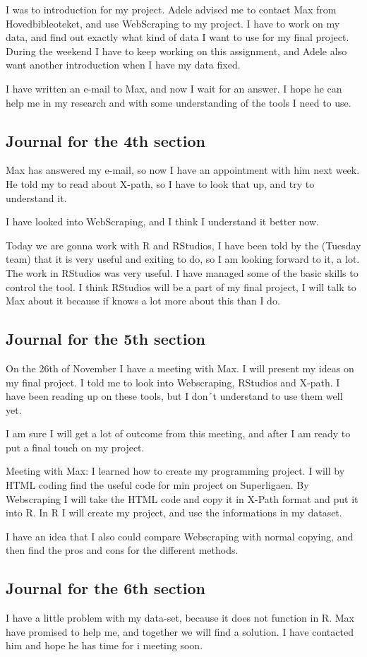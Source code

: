 \documentclass{article}
\begin{document}
I was to introduction for my project. Adele advised me to contact Max from Hovedbibleoteket, and use WebScraping to my project. I have to work on my data, and find out exactly what kind of data I want to use for my final project. During the weekend I have to keep working on this assignment, and Adele also want another introduction when I have my data fixed. 

I have written an e-mail to Max, and now I wait for an answer. I hope he can help me in my research and with some understanding of the tools I need to use.  

\subsection {Journal for the 4th section}
Max has answered my e-mail, so now I have an appointment with him next week. He told my to read about X-path, so I have to look that up, and try to understand it.

I have looked into WebScraping, and I think I understand it better now. 

Today we are gonna work with R and RStudios, I have been told by the (Tuesday team) that it is very useful and exiting to do, so I am looking forward to it, a lot. 
The work in RStudios was very useful. I have managed some of the basic skills to control the tool. I think RStudios will be a part of my final project, I will talk to Max about it because if knows a lot more about this than I do. 

\subsection {Journal for the 5th section}
On the 26th of November I have a meeting with Max. I will present my ideas on my final project. I told me to look into Webscraping, RStudios and X-path. I have been reading up on these tools, but I don´t understand to use them well yet. 

I am sure I will get a lot of outcome from this meeting, and after I am ready to put a final touch on my project. 

Meeting with Max: I learned how to create my programming project. I will by HTML coding find the useful code for min project on Superligaen. By Webscraping I will take the HTML code and copy it in X-Path format and put it into R. 
In R I will create my project, and use the informations in my dataset. 

I have an idea that I also could compare Webscraping with normal copying, and then find the pros and cons for the different methods. 


\subsection {Journal for the 6th section}

I have a little problem with my data-set, because it does not function in R. Max have promised to help me, and together we will find a solution. I have contacted him and hope he has time for i meeting soon. 

\pagebreak{}
\end{document}
